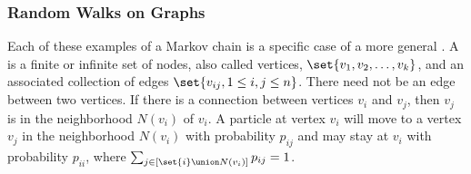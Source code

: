 \documentclass[12pt]{article}
\begin{document}
\subsubsection*{Random Walks on Graphs}

Each of these examples of a Markov chain is a specific case of a more
general .  A  is a finite or%
infinite set of nodes, also called vertices, \( \set{v_1, v_2, \dots, v_k}
\), and an associated collection of edges \( \set{v_{ij}, 1 \le i,j \le
n} \).  There need not be an edge between two vertices.  If there is a
connection between vertices \( v_i \) and \( v_j \), then \( v_j \) is
in the neighborhood \( N(v_i) \) of \( v_i \).%
A particle at vertex \( v_i \) will move to a vertex \( v_j \) in the
neighborhood \( N(v_i) \) with probability \( p_{ij} \) and may stay at \(
v_i \) with probability \( p_{ii} \), where \( \sum_{j \in [\set{i}
\union N(v_i)]} p_{ij} = 1 \).
\end{document}
